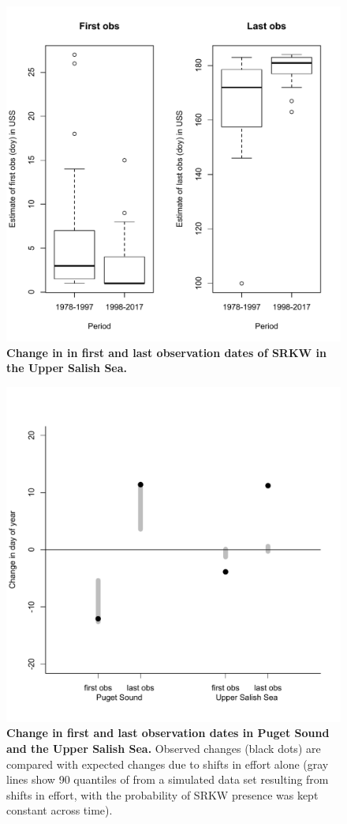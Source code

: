 \documentclass{article}
\begin{document}
 \begin{figure}[p]
\includegraphics{../analyses/orcaphen/figures/boxplots_1978_2017_uss.pdf} 
\caption{\textbf{Change in in first and last observation dates of SRKW in the Upper Salish Sea.} }
 \label{fig:boxplot2}
 \end{figure}
 
\begin{figure}[p]
\includegraphics{../analyses/orcaphen/figures/simvdata_1978_2017.pdf} 
\caption{\textbf{Change in first and last observation dates in Puget Sound and the Upper Salish Sea.} Observed changes (black dots) are compared with expected changes due to shifts in effort alone (gray lines show 90 quantiles of from a simulated data set resulting from shifts in effort, with the probability of SRKW presence was kept constant across time).}
 \label{fig:sim}
 \end{figure}
 
\end{document}
